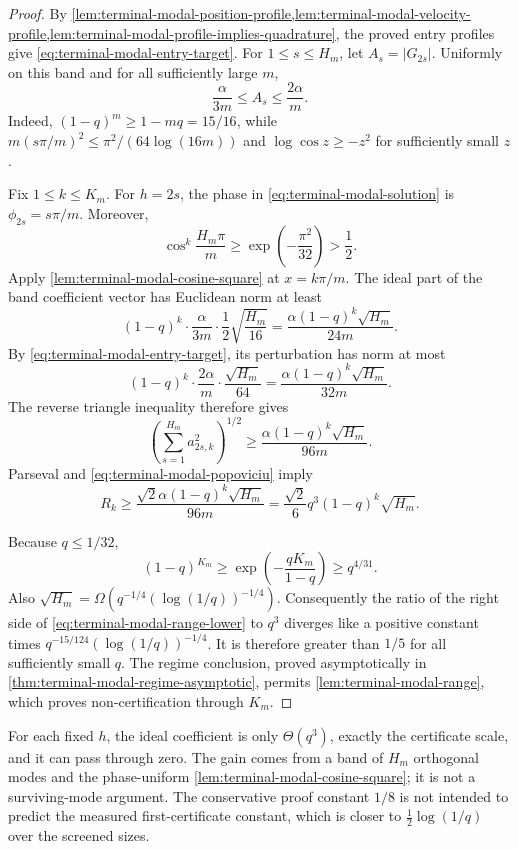 \begin{proof}
By
\cref{lem:terminal-modal-position-profile,lem:terminal-modal-velocity-profile,lem:terminal-modal-profile-implies-quadrature},
the proved entry profiles give \eqref{eq:terminal-modal-entry-target}.
For $1\le s\le H_m$, let $A_s=|G_{2s}|$.  Uniformly on this band and for all
sufficiently large $m$,
\begin{equation}
 \frac{\alpha}{3m}\le A_s\le\frac{2\alpha}{m}.
 \label{eq:terminal-modal-amplitude-bounds}
\end{equation}
Indeed, $(1-q)^m\ge1-mq=15/16$, while
$m(s\pi/m)^2\le\pi^2/(64\log(16m))$ and
$\log\cos z\ge-z^2$ for sufficiently small $z$.

Fix $1\le k\le K_m$.  For $h=2s$, the phase in
\cref{eq:terminal-modal-solution} is $\phi_{2s}=s\pi/m$.  Moreover,
\begin{equation}
 \cos^{k}\frac{H_m\pi}{m}
 \ge \exp\!\left(-\frac{\pi^2}{32}\right)>\frac12.
 \label{eq:terminal-modal-spatial-damping}
\end{equation}
Apply \cref{lem:terminal-modal-cosine-square} at
$x=k\pi/m$.  The ideal part of the band coefficient vector has Euclidean norm
at least
\[
 (1-q)^k\cdot\frac{\alpha}{3m}\cdot\frac12
 \sqrt{\frac{H_m}{16}}
 =\frac{\alpha(1-q)^k\sqrt{H_m}}{24m}.
\]
By \eqref{eq:terminal-modal-entry-target}, its perturbation has norm at most
\[
 (1-q)^k\cdot\frac{2\alpha}{m}\cdot
 \frac{\sqrt{H_m}}{64}
 =\frac{\alpha(1-q)^k\sqrt{H_m}}{32m}.
\]
The reverse triangle inequality therefore gives
\begin{equation}
 \left(\sum_{s=1}^{H_m}a_{2s,k}^2\right)^{1/2}
 \ge\frac{\alpha(1-q)^k\sqrt{H_m}}{96m}.
 \label{eq:terminal-modal-band-energy}
\end{equation}
Parseval and \cref{eq:terminal-modal-popoviciu} imply
\begin{equation}
 R_k\ge
 \frac{\sqrt2\alpha(1-q)^k\sqrt{H_m}}{96m}
 =\frac{\sqrt2}{6}q^3(1-q)^k\sqrt{H_m}.
 \label{eq:terminal-modal-range-lower}
\end{equation}

Because $q\le1/32$,
\[
 (1-q)^{K_m}
 \ge \exp\!\left(-\frac{qK_m}{1-q}\right)
 \ge q^{4/31}.
\]
Also
$\sqrt{H_m}=\Omega(q^{-1/4}(\log(1/q))^{-1/4})$.  Consequently the ratio of
the right side of \eqref{eq:terminal-modal-range-lower} to $q^3$ diverges
like a positive constant times
$q^{-15/124}(\log(1/q))^{-1/4}$.  It is therefore greater than $1/5$ for all
sufficiently small $q$.  The regime conclusion, proved asymptotically in
\cref{thm:terminal-modal-regime-asymptotic}, permits
\cref{lem:terminal-modal-range}, which proves non-certification through
$K_m$.
\end{proof}

\begin{remark}
For each fixed $h$, the ideal coefficient is only $\Theta(q^3)$, exactly the
certificate scale, and it can pass through zero.  The gain comes from a band
of $H_m$ orthogonal modes and the phase-uniform
\cref{lem:terminal-modal-cosine-square}; it is not a surviving-mode argument.
The conservative proof constant $1/8$ is not intended to predict the measured
first-certificate constant, which is closer to
$\frac12\log(1/q)$ over the screened sizes.
\end{remark}
